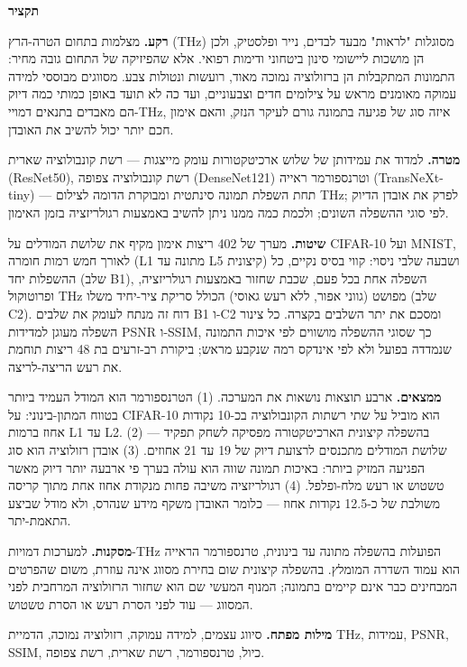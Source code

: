 
\noindent\textbf{תקציר}

\medskip

\noindent\textbf{רקע.}\quad
מצלמות בתחום הטרה-הרץ (THz) מסוגלות "לראות" מבעד לבדים, נייר ופלסטיק,
ולכן הן מושכות ליישומי סינון ביטחוני ודימות רפואי. אלא שהפיזיקה של התחום
גובה מחיר: התמונות המתקבלות הן ברזולוציה נמוכה מאוד, רועשות ונטולות צבע.
מסווגים מבוססי למידה עמוקה מאומנים מראש על צילומים חדים וצבעוניים, ועד
כה לא תועד באופן כמותי כמה דיוק הם מאבדים בתנאים דמויי-THz, איזה סוג של
פגיעה בתמונה גורם לעיקר הנזק, והאם אימון חכם יותר יכול להשיב את האובדן.

\noindent\textbf{מטרה.}\quad
למדוד את עמידותן של שלוש ארכיטקטורות עומק מייצגות --- רשת קונבולוציה
שארית (ResNet50), רשת קונבולוציה צפופה (DenseNet121) וטרנספורמר ראייה
(TransNeXt-tiny) --- תחת השפלת תמונה סינתטית ומבוקרת הדומה לצילום THz;
לפרק את אובדן הדיוק לפי סוגי ההשפלה השונים; ולכמת כמה ממנו ניתן להשיב
באמצעות רגולריזציה בזמן האימון.

\noindent\textbf{שיטות.}\quad
מערך של 402 ריצות אימון מקיף את שלושת המודלים על CIFAR-10 ועל MNIST,
לאורך חמש רמות חומרה (L1 מתונה עד L5 קיצונית) ושבעה שלבי ניסוי: קווי
בסיס נקיים, כל ההשפלות יחד (שלב B1), השפלה אחת בכל פעם, שכבת שחזור
באמצעות רגולריזציה, ופרוטוקול THz מפושט (גווני אפור, ללא רעש גאוסי)
הכולל סריקת ציר-יחיד משלו (שלב C2). דוח זה מנתח לעומק את שלבים B1 ו-C2
ומסכם את יתר השלבים בקצרה. כל צינור השפלה מעוגן למדידות PSNR ו-SSIM,
כך שסוגי ההשפלה מושווים לפי איכות התמונה שנמדדה בפועל ולא לפי אינדקס
רמה שנקבע מראש; ביקורת רב-זרעים בת 48 ריצות תוחמת את רעש הריצה-לריצה.

\noindent\textbf{ממצאים.}\quad
ארבע תוצאות נושאות את המערכה. (1) הטרנספורמר הוא המודל העמיד ביותר
בטווח המתון-בינוני: על CIFAR-10 הוא מוביל על שתי רשתות הקונבולוציה
בכ-10 נקודות אחוז ברמות L1 עד L2. (2) בהשפלה קיצונית הארכיטקטורה מפסיקה
לשחק תפקיד --- שלושת המודלים מתכנסים לרצועת דיוק של 19 עד 21 אחוזים.
(3) אובדן רזולוציה הוא סוג הפגיעה המזיק ביותר: באיכות תמונה שווה הוא
עולה בערך פי ארבעה יותר דיוק מאשר טשטוש או רעש מלח-ופלפל. (4)
רגולריזציה משיבה פחות מנקודת אחוז אחת מתוך קריסה משולבת של כ-12.5
נקודות אחוז --- כלומר האובדן משקף מידע שנהרס, ולא מודל שביצע התאמת-יתר.

\noindent\textbf{מסקנות.}\quad
למערכות דמויות-THz הפועלות בהשפלה מתונה עד בינונית, טרנספורמר הראייה
הוא עמוד השדרה המומלץ. בהשפלה קיצונית שום בחירת מסווג אינה עוזרת, משום
שהפרטים המבחינים כבר אינם קיימים בתמונה; המנוף המעשי שם הוא שחזור
הרזולוציה המרחבית לפני המסווג --- עוד לפני הסרת רעש או הסרת טשטוש.

\noindent\textbf{מילות מפתח.}\quad
סיווג עצמים, למידה עמוקה, רזולוציה נמוכה, הדמיית THz, עמידות, PSNR,
SSIM, כיול, טרנספורמר, רשת שארית, רשת צפופה.
